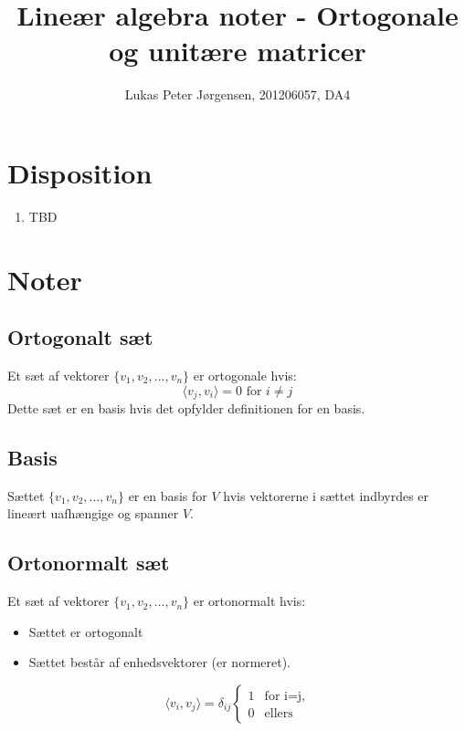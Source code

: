 \documentclass[a4paper,oneside,article]{memoir}
\newcommand{\inner}[2]{\langle #1,#2 \rangle}
\begin{document}
    \title{Lineær algebra noter - Ortogonale og unitære matricer}
    \author{Lukas Peter Jørgensen, 201206057, DA4
            }
    \maketitle
    
    \tableofcontents
        
    \chapter{Disposition}
    \begin{enumerate}
    \item TBD
    \end{enumerate}
    
	\chapter{Noter}
	
	\section{Ortogonalt sæt}
	Et sæt af vektorer $\{v_1,v_2,\dots,v_n\}$ er ortogonale hvis:
	$$\inner{v_j}{v_i}=0 \text{ for } i\neq j$$
	Dette sæt er en basis hvis det opfylder definitionen for en
	basis.
	
	\section{Basis}
	Sættet $\{v_1,v_2,\dots,v_n\}$ er en basis for $V$ hvis 
	vektorerne i sættet indbyrdes er lineært uafhængige og spanner
	$V$.
	
	\section{Ortonormalt sæt}
	Et sæt af vektorer $\{v_1,v_2,\dots,v_n\}$ er ortonormalt hvis:
	\begin{itemize}
	\item Sættet er ortogonalt
	\item Sættet består af enhedsvektorer (er normeret).
	\end{itemize}
	$$\inner{v_i}{v_j} = \delta_{ij} \left\{ \begin{array}{ll}
		         1 & \mbox{for i=j},\\
		        0 & \mbox{ellers}\end{array} \right.$$
		        
\end{document}
